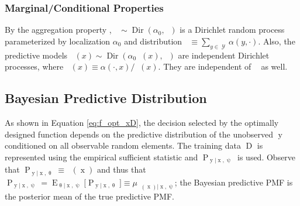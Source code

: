 \documentclass{article}
\DeclareMathOperator{\xrm}{\mathrm{x}}
\DeclareMathOperator{\yrm}{\mathrm{y}}
\DeclareMathOperator{\Drm}{\mathrm{D}}
\DeclareMathOperator{\Prm}{\mathrm{P}}
\DeclareMathOperator{\Erm}{\mathrm{E}}
\DeclareMathOperator{\Ycal}{\mathcal{Y}}
\DeclareMathOperator{\Dir}{\mathrm{Dir}}
\DeclareMathOperator{\upthetam}{\uptheta_\text{m}}
\DeclareMathOperator{\upthetac}{\uptheta_\text{c}}
\DeclareMathOperator{\alpham}{\alpha_\text{m}}
\DeclareMathOperator{\alphac}{\alpha_\text{c}}
\begin{document}
\subsubsection{Marginal/Conditional Properties} \label{sec:P_theta_mc}

By the aggregation property \cite{ferguson}, $\upthetam \sim \Dir(\alpha_0,\alpham)$ is a Dirichlet random process parameterized by localization $\alpha_0$ and distribution $\alpham \equiv \sum_{y \in \Ycal} \alpha(y,\cdot)$. Also, the predictive models $\upthetac(x) \sim \Dir(\alpha_0 \alpham(x),\alphac)$ are independent Dirichlet processes, where $\alphac(x) \equiv \alpha(\cdot,x) / \alpham(x)$. They are independent of $\upthetam$ as well. 














\subsection{Bayesian Predictive Distribution}

As shown in Equation \eqref{eq:f_opt_xD}, the decision selected by the optimally designed function depends on the predictive distribution of the unobserved $\yrm$ conditioned on all observable random elements. The training data $\Drm$ is represented using the empirical sufficient statistic and $\Prm_{\yrm | \xrm,\uppsi}$ is used. Observe that $\Prm_{\yrm | \xrm,\uptheta} \equiv \upthetac(\xrm)$ and thus that $\Prm_{\yrm | \xrm,\uppsi} = \Erm_{\uptheta | \xrm,\uppsi}\big[ \Prm_{\yrm | \xrm,\uptheta} \big] \equiv \mu_{\upthetac(\xrm) | \xrm,\uppsi}$; the Bayesian predictive PMF is the posterior mean \cite{murphy} of the true predictive PMF.
\end{document}
